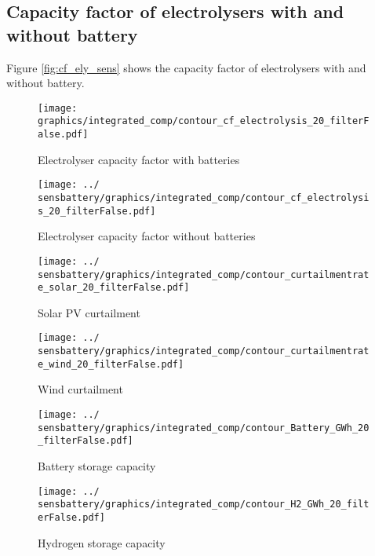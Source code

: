 \subsection{Capacity factor of electrolysers with and without battery}
Figure \ref{fig:cf_ely_sens} shows the capacity factor of electrolysers with and without battery.

\begin{figure*}[h] 
    \centering
    \begin{subfigure}[b]{0.45\linewidth}
        \centering
        \texttt{[image: graphics/integrated\_comp/contour\_cf\_electrolysis\_20\_filterFalse.pdf]}
        \caption{Electrolyser capacity factor with batteries}
        \label{fig:ely_cf}
    \end{subfigure}
    \hfill
    \begin{subfigure}[b]{0.45\linewidth}
        \centering
        \texttt{[image: ../\\sensbattery/graphics/integrated\_comp/contour\_cf\_electrolysis\_20\_filterFalse.pdf]}
        \caption{Electrolyser capacity factor without batteries}
        \label{fig:ely_cf_nobat}
    \end{subfigure}
    \hfill

    \caption{Capacity Factor (CF) of electrolysers with and without batteries.}
    \label{fig:cf_ely_sens}
\end{figure*}



\begin{figure*}[h] %
    \centering
    \begin{subfigure}[b]{0.45\linewidth}
        \centering
        \texttt{[image: ../\\sensbattery/graphics/integrated\_comp/contour\_curtailmentrate\_solar\_20\_filterFalse.pdf]}
        \caption{Solar PV curtailment}
        \label{fig:solar_curt}
    \end{subfigure}
    \hfill
    \begin{subfigure}[b]{0.45\linewidth}
        \centering
        \texttt{[image: ../\\sensbattery/graphics/integrated\_comp/contour\_curtailmentrate\_wind\_20\_filterFalse.pdf]}
        \caption{Wind curtailment}
        \label{fig:wind_curt}
    \end{subfigure}
    \hfill
    \begin{subfigure}[b]{0.45\linewidth}
        \centering
        \texttt{[image: ../\\sensbattery/graphics/integrated\_comp/contour\_Battery\_GWh\_20\_filterFalse.pdf]}
        \caption{Battery storage capacity}
        \label{fig:battery_cap}
    \end{subfigure}
    \hfill
    \begin{subfigure}[b]{0.45\linewidth}
        \centering
        \texttt{[image: ../\\sensbattery/graphics/integrated\_comp/contour\_H2\_GWh\_20\_filterFalse.pdf]}
        \caption{Hydrogen storage capacity}
        \label{fig:hystorage_cap}
    \end{subfigure}
    \hfill

    \caption{Scenario no batteries: Curtailment rates and storage capacities}
    \label{fig:integration_options_nobat}
\end{figure*}


\clearpage